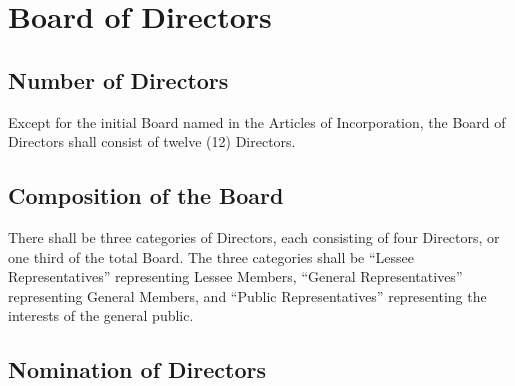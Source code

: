 \section{Board of Directors}
\label{sec:directors}

\subsection{Number of Directors}

Except for the initial Board named in the Articles of Incorporation,
the Board of Directors shall consist of twelve (12) Directors.

\subsection{Composition of the Board}

There shall be three categories of Directors, each consisting of four
Directors, or one third of the total Board. The three categories shall
be ``Lessee Representatives'' representing Lessee Members, ``General
Representatives'' representing General Members, and ``Public
Representatives'' representing the interests of the general public.

\subsection{Nomination of Directors}

